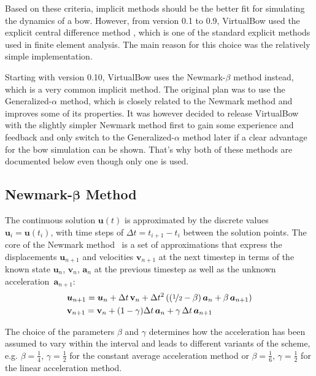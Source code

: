Based on these criteria, implicit methods should be the better fit for simulating the dynamics of a bow.
However, from version 0.1 to 0.9, VirtualBow used the explicit central difference method \cite{bib:bathe2006}, which is one of the standard explicit methods used in finite element analysis.
The main reason for this choice was the relatively simple implementation.

Starting with version 0.10, VirtualBow uses the Newmark-$\beta$ method instead, which is a very common implicit method.
The original plan was to use the Generalized-$\alpha$ method, which is closely related to the Newmark method and improves some of its properties.
It was however decided to release VirtualBow with the slightly simpler Newmark method first to gain some experience and feedback and only switch to the Generalized-$\alpha$ method later if a clear advantage for the bow simulation can be shown.
That's why both of these methods are documented below even though only one is used.

\subsection{Newmark-$\boldsymbol{\beta}$ Method}

The continuous solution $\boldsymbol{u}(t)$ is approximated by the discrete values~$\boldsymbol{u}_i = \boldsymbol{u}(t_{i})$, with time steps of $\Delta t = t_{i+1} - t_{i}$ between the solution points.
The core of the Newmark method~\cite{bib:bathe2006} is a set of approximations that express the displacements $\boldsymbol{u}_{n+1}$ and velocities $\mathbf{v}_{n+1}$ at the next timestep in terms of the known state $\boldsymbol{u}_{n}$, $\mathbf{v}_{n}$, $\boldsymbol{a}_{n}$ at the previous timestep as well as the unknown acceleration~$\boldsymbol{a}_{n+1}$:
%
\begin{align}
&\boldsymbol{u}_{n+1} = \boldsymbol{u}_{n} + \Delta t\,\mathbf{v}_{n} + \Delta t^2 \left( \left(\nicefrac{1}{2} - \beta\right)\boldsymbol{a}_{n} + \beta\,\boldsymbol{a}_{n+1} \right) \label{eq:newmark_u} \\
&\mathbf{v}_{n+1} = \mathbf{v}_{n} + (1 - \gamma)\Delta t\,\boldsymbol{a}_{n} + \gamma\,\Delta t\,\boldsymbol{a}_{n+1} \label{eq:newmark_v}
\end{align}

The choice of the parameters $\beta$ and $\gamma$ determines how the acceleration has been assumed to vary within the interval and leads to different variants of the scheme, e.g. $\beta = \frac{1}{4},\,\gamma = \frac{1}{2}$ for the constant average acceleration method or $\beta = \frac{1}{6},\,\gamma = \frac{1}{2}$ for the linear acceleration method.

